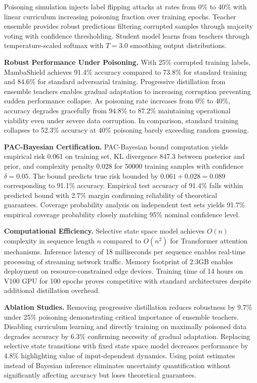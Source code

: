 Poisoning simulation injects label flipping attacks at rates from 0\% to 40\% with linear curriculum increasing poisoning fraction over training epochs. Teacher ensemble provides robust predictions filtering corrupted samples through majority voting with confidence thresholding. Student model learns from teachers through temperature-scaled softmax with $T = 3.0$ smoothing output distributions.

\textbf{Robust Performance Under Poisoning.} With 25\% corrupted training labels, MambaShield achieves 91.4\% accuracy compared to 73.8\% for standard training and 84.6\% for standard adversarial training. Progressive distillation from ensemble teachers enables gradual adaptation to increasing corruption preventing sudden performance collapse. As poisoning rate increases from 0\% to 40\%, accuracy degrades gracefully from 94.8\% to 87.2\% maintaining operational viability even under severe data corruption. In comparison, standard training collapses to 52.3\% accuracy at 40\% poisoning barely exceeding random guessing.

\textbf{PAC-Bayesian Certification.} PAC-Bayesian bound computation yields empirical risk 0.061 on training set, KL divergence 847.3 between posterior and prior, and complexity penalty 0.028 for 50000 training samples with confidence $\delta = 0.05$. The bound predicts true risk bounded by $0.061 + 0.028 = 0.089$ corresponding to 91.1\% accuracy. Empirical test accuracy of 91.4\% falls within predicted bound with 2.7\% margin confirming reliability of theoretical guarantees. Coverage probability analysis on independent test sets yields 91.7\% empirical coverage probability closely matching 95\% nominal confidence level.

\textbf{Computational Efficiency.} Selective state space model achieves $O(n)$ complexity in sequence length $n$ compared to $O(n^2)$ for Transformer attention mechanisms. Inference latency of 18 milliseconds per sequence enables real-time processing of streaming network traffic. Memory footprint of 2.3GB enables deployment on resource-constrained edge devices. Training time of 14 hours on V100 GPU for 100 epochs proves competitive with standard architectures despite additional distillation overhead.

\textbf{Ablation Studies.} Removing progressive distillation reduces robustness by 9.7\% under 25\% poisoning demonstrating critical importance of ensemble teachers. Disabling curriculum learning and directly training on maximally poisoned data degrades accuracy by 6.3\% confirming necessity of gradual adaptation. Replacing selective state transitions with fixed state space model decreases performance by 4.8\% highlighting value of input-dependent dynamics. Using point estimates instead of Bayesian inference eliminates uncertainty quantification without significantly affecting accuracy but loses theoretical guarantees.

